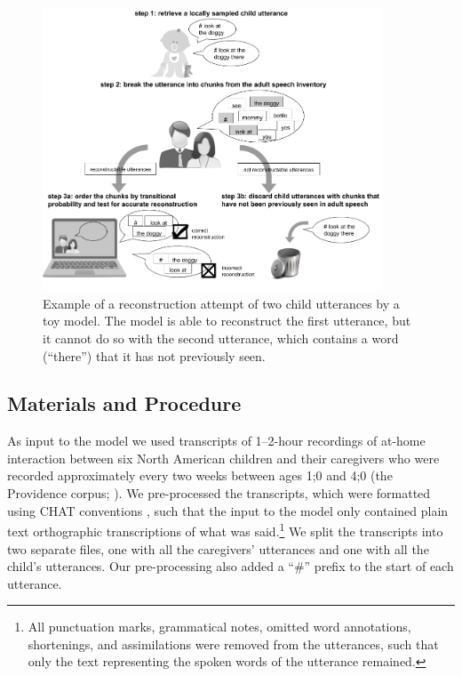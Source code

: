 \documentclass{article}
\begin{document}
\begin{figure}
\centering
\includegraphics[width=0.9\textwidth]{reconstruction_task.png} 
\caption{Example of a reconstruction attempt of two child utterances by a toy model. The model is able to reconstruct the first utterance, but it cannot do so with the second utterance, which contains a word  (``there'') that it has not previously seen.}
\label{fig:reconstruction}
\end{figure}

\subsection{Materials and Procedure}

As input to the model we used transcripts of 1--2-hour recordings of at-home interaction between six North American children and their caregivers who were recorded approximately every two weeks between ages 1;0 and 4;0 (the Providence corpus; ). We pre-processed the transcripts, which were formatted using CHAT conventions \cite{childes}, such that the input to the model only contained plain text orthographic transcriptions of what was said.\footnote{All punctuation marks, grammatical notes, omitted word annotations, shortenings, and assimilations were removed from the utterances, such that only the text representing the spoken words of the utterance remained.} We split the transcripts into two separate files, one with all the caregivers' utterances and one with all the child's utterances. Our pre-processing also added a ``\#'' prefix to the start of each utterance.
\end{document}
